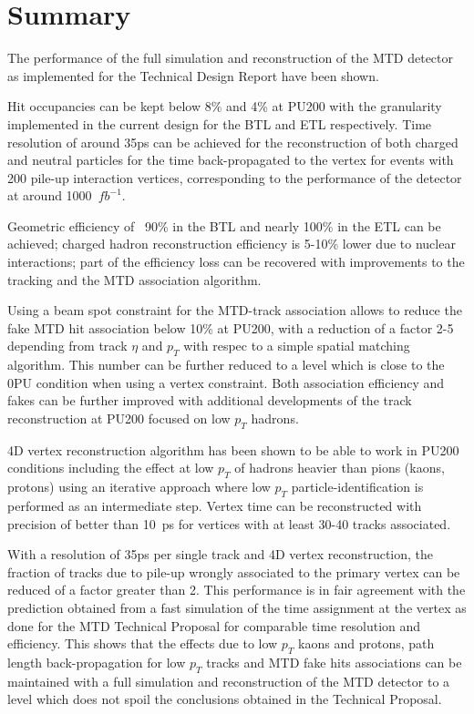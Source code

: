 \section{Summary}
The performance of the full simulation and reconstruction of the MTD detector as implemented for the Technical Design Report have been shown. 

Hit occupancies can be kept below 8\% and 4\% at PU200 with the granularity implemented in the current design for the BTL and ETL respectively. Time resolution of around 35ps can be achieved for the reconstruction of both charged and neutral particles for the time back-propagated to the vertex for events with 200 pile-up interaction vertices, corresponding to the performance of the detector at around 1000~$fb^{-1}$.

Geometric efficiency of ~90\% in the BTL and nearly 100\% in the ETL can be achieved; charged hadron reconstruction efficiency is 5-10\% lower due to nuclear interactions; part of the efficiency loss can be recovered with improvements to the tracking and the MTD association algorithm. 

Using a beam spot constraint for the MTD-track association allows to reduce the fake MTD hit association below 10\% at PU200, with a reduction of a factor 2-5 depending from track $\eta$ and $p_{T}$ with respec to a simple spatial matching algorithm. This number can be further reduced to a level which is close to the 0PU condition when using a vertex constraint. Both association efficiency and fakes can be further improved with additional developments of the track reconstruction at PU200 focused on low $p_{T}$ hadrons. 

4D vertex reconstruction algorithm has been shown to be able to work in PU200 conditions including the effect at low $p_{T}$ of hadrons heavier than pions (kaons, protons) using an iterative approach where low $p_{T}$ particle-identification is performed as an intermediate step. Vertex time can be reconstructed with precision of better than 10~ps for vertices with at least 30-40 tracks associated. 

With a resolution of 35ps per single track and 4D vertex reconstruction, the fraction of tracks due to pile-up wrongly associated to the primary vertex can be reduced of a factor greater than 2. This performance is in fair agreement with the prediction obtained from a fast simulation of the time assignment at the vertex as done for the MTD Technical Proposal for comparable time resolution and efficiency. This shows that the effects due to low $p_{T}$ kaons and protons, path length back-propagation for low $p_{T}$ tracks and MTD fake hits associations can be maintained with a full simulation and reconstruction of the MTD detector to a level which does not spoil the conclusions obtained in the Technical Proposal. 